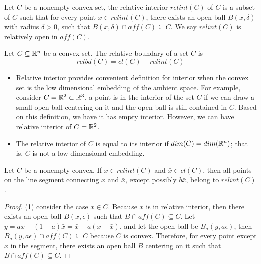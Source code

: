 \begin{refsection}
\begin{definition}\cite[23]{bertsekas2009convex}
Let $C$ be a nonempty convex set, the relative interior $relint(C)$ of $C$ is a subset of $C$ such that for every point $x\in relint(C)$, there exists an open ball $B(x,\delta)$ with radius $\delta >0$, such that $B(x,\delta)\cap aff(C) \subseteq C$.
We say $relint(C)$ is relatively open in $aff(C)$. 
\end{definition}



\begin{definition}
Let $C\subseteq \mathbb{R}^n$ be a convex set. 	The relative boundary of a set $C$ is $$relbd(C) = cl(C) - relint(C)$$
\end{definition}

\begin{remark}\hfill
	\begin{itemize}
		\item Relative interior provides convenient definition for interior when the convex set is the low dimensional embedding of the ambient space.  For example, consider $C=\mathbb{R}^2\subset \mathbb{R}^3$, a point is in the interior of the set $C$ if we can draw a small open ball centering on it and the open ball is still contained in $C$. Based on this definition, we have it has empty interior. However, we can have relative interior of $C = \mathbb{R}^2$.
		\item The relative interior of $C$ is equal to its interior if $dim(C) = dim(\mathbb{R}^n)$; that is, $C$ is not a low dimensional embedding.
	\end{itemize}
\end{remark}


\begin{lemma}\cite[24]{bertsekas2009convex}
Let $C$ be a nonempty convex. If $x\in relint(C)$ and $\bar{x} \in cl(C)$, then all points on the line segment connecting $x$ and $\bar{x}$, except possibly $b\bar{x}$, belong to $relint(C)$.
\end{lemma}
\begin{proof}
(1) consider the case $\bar{x}\in C$. Because $x$ is in relative interior, then there exists an open ball $B(x,\epsilon)$ such that $B\cap aff(C)\subseteq C$. Let $y = ax + (1-a)\bar{x} = \bar{x} + a(x-\bar{x})$, and let the open ball be $B_a(y,a\epsilon)$, then $B_a(y,a\epsilon) \cap aff(C) \subseteq C$ because $C$ is convex. Therefore, for every point except $\bar{x}$ in the segment, there exists an open ball $B$ centering on it such that $B\cap aff(C) \subseteq C$.


\end{proof}
\end{refsection}
